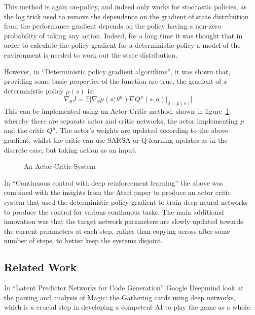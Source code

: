 This method is again on-policy, and indeed only works for stochastic policies, as the log trick used to remove the dependence on the gradient of state distribution from the performance gradient depends on the policy having a non-zero probability of taking any action. Indeed, for a long time it was thought that in order to calculate the policy gradient for a deterministic policy a model of the environment is needed to work out the state distribution.

However, in ``Deterministic policy gradient algorithms''\cite{silver2014deterministic}, it was shown that, providing some basic properties of the function are true, the gradient of a deterministic policy $\mu(s)$ is:
\begin{equation}
\nabla_\theta J =\mathbb{E}\big[ \nabla_\theta  \mu ( s ; \theta^\mu) \nabla Q^\mu (s,a)|_{a = \mu(s)}\big]
\end{equation}
This can be implemented using an Actor-Critic method, shown in figure~\ref{fig:actcrit}, whereby there are separate actor and critic networks, the actor implementing $\mu$ and the critic $Q^\mu$. The actor's weights are updated according to the above gradient, whilst the critic can use SARSA or Q learning updates as in the discrete case, but taking action as an input.


\begin{figure}
\centering

\caption{An Actor-Critic System}
\label{fig:actcrit}
\end{figure}



In ``Continuous control with deep reinforcement learning'' \cite{lillicrap2015continuous} the above was combined with the insights from the Atari paper \cite{atariDQN} to produce an actor critic system that used the deterministic policy gradient to train deep neural networks to produce the control for various continuous tasks. The main additional innovation was that the target network parameters are slowly updated towards the current parameters at each step, rather than copying across after some number of steps, to better keep the systems disjoint.

\subsection{Related Work}
In ``Latent Predictor Networks for Code Generation''\cite{ling2016latent} %
Google Deepmind look at the parsing and analysis of Magic: the Gathering cards using deep networks, which is a crucial step in developing a competent AI to play the game as a whole.

